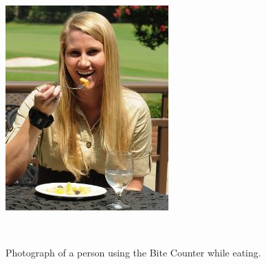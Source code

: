 \begin{figure}
        \centering
                \includegraphics[]{images/BCEater.JPG}

                \label{fig:gull}
        ~ %
         \caption{Photograph of a person using the Bite Counter while eating.}\label{Fig:BCEater}
\end{figure}

